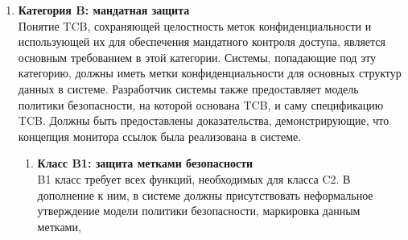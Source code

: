 \begin{enumerate}
\begin{enumerate}
\begin{enumerate}
\begin{enumerate}
\begin{itemize}
					некоторым подмножеством объектов и субъектов в компьютерной системе. TCB должен изолировать защищаемые ресурсы таким образом, чтобы на них распространялись требования контроля
					доступа и аудита.
					\item{\textbf{Целостность системы}}\\
					Должны быть предусмотрены аппаратные и/или программные средства, могут быть использованы для периодической проверки правильности работы аппаратных и программных элементов TCB.
				\end{itemize}
				\item{\textbf{Гарантия жизненного цикла}}
				\begin{itemize}
					\item{\textbf{Тестирование безопасности}}\\
					Защитные механизмы должны быть протестированы и проверены на работоспособность в соответствии с сопроводительной документацией на компьютерную систему.
					Тестирование проводится с целью удостоверения в отсутствии способов обхода неавторизованным пользователем защитных механизмов TCB. Тестирование должно также включать в себя
					поиск уязвимостей, позволяющих нарушить изоляцию ресурсов или получить несанкционированный доступ к журналам аудита или к данным аутентификации.
				\end{itemize}
			\end{enumerate}
		\end{enumerate}
	\end{enumerate}
	\item{\textbf{Категория B: мандатная защита}}\\
	Понятие TCB, сохраняющей целостность меток конфиденциальности и использующей их для обеспечения мандатного контроля доступа, является основным требованием в этой категории. Системы, попадающие
	под эту категорию, должны иметь метки конфиденциальности для основных структур данных в системе. Разработчик системы также предоставляет модель политики безопасности, на которой основана TCB, и
	саму спецификацию TCB. Должны быть предоставлены доказательства, демонстрирующие, что концепция монитора ссылок была реализована в системе.
	\begin{enumerate}
		\item{\textbf{Класс B1: защита метками безопасности}}\\
		B1 класс требует всех функций, необходимых для класса C2. В дополнение к ним, в системе должны присутствовать неформальное утверждение модели политики безопасности, маркировка данным метками,

\end{enumerate}
\end{enumerate}
